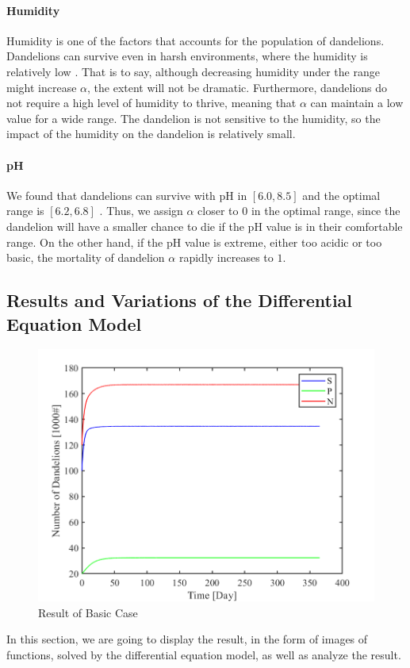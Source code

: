 \documentclass[12pt]{article}
\begin{document}
\paragraph{Humidity}
Humidity is one of the factors that accounts for the population of dandelions. Dandelions can survive even in harsh environments, where the humidity is relatively low \cite{idris_yau_learn_2022}. That is to say, although decreasing humidity under the range might increase $\alpha$, the extent will not be dramatic. Furthermore, dandelions do not require a high level of humidity to thrive, meaning that $\alpha$ can maintain a low value for a wide range. The dandelion is not sensitive to the humidity, so the impact of the humidity on the dandelion is relatively small.

\paragraph{pH}
We found that dandelions can survive with pH in \([6.0,8.5]\) and the optimal range is \([6.2,6.8]\) \cite{dekker_how_2021}. Thus, we assign $\alpha$ closer to $0$ in the optimal range, since the dandelion will have a smaller chance to die if the pH value is in their comfortable range. On the other hand, if the pH value is extreme, either too acidic or too basic, the mortality of dandelion $\alpha$ rapidly increases to $1$.

\subsection{Results and Variations of the Differential Equation Model}
\begin{figure}
    \centering
    \includegraphics[width=0.5\linewidth]{img/100-20.png}
    \caption{Result of Basic Case}
    \label{basic}
\end{figure}
In this section, we are going to display the result, in the form of images of functions, solved by the differential equation model, as well as analyze the result.
\end{document}
